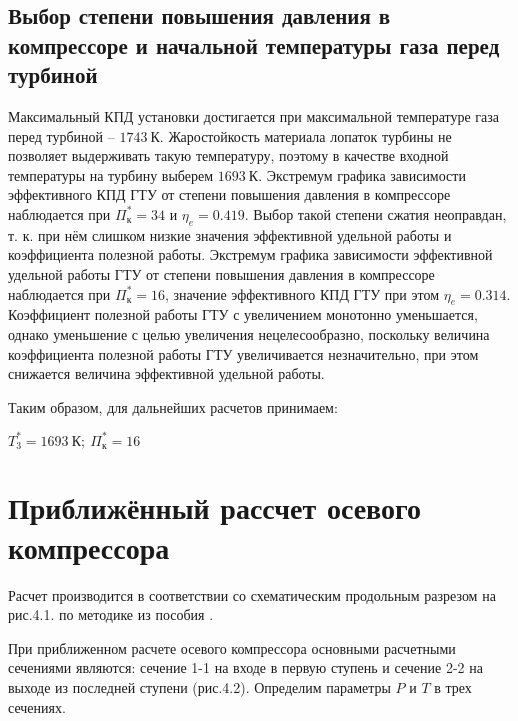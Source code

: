 

\newpage
\subsection{Выбор степени повышения давления в компрессоре и начальной температуры газа перед турбиной}

	Максимальный КПД установки достигается при максимальной температуре газа перед турбиной – $1743 \ \text{К}$. Жаростойкость материала лопаток турбины не позволяет выдерживать такую температуру, поэтому в качестве входной температуры на турбину выберем $1693 \ \text{К}$. Экстремум графика зависимости эффективного КПД ГТУ от степени повышения давления в компрессоре наблюдается при $\Pi_{\text{к}}^*=34$ и $\eta_e = 0.419$. Выбор такой степени сжатия неоправдан, т. к. при нём слишком низкие значения эффективной удельной работы и коэффициента полезной работы. Экстремум графика зависимости эффективной удельной работы ГТУ от степени повышения давления в компрессоре наблюдается при $\Pi_{\text{к}}^*=16$, значение эффективного КПД ГТУ при этом $\eta_e = 0.314$. Коэффициент полезной работы ГТУ с увеличением  монотонно уменьшается, однако уменьшение  с целью увеличения  нецелесообразно, поскольку величина коэффициента полезной работы ГТУ увеличивается незначительно, при этом снижается величина эффективной удельной работы.

 Таким образом, для дальнейших расчетов принимаем:
 
$T_3^* = 1693 \ \text{К}; \ \Pi_{\text{к}}^*=16$

\newpage
\section{Приближённый рассчет осевого компрессора}

Расчет производится в соответствии со схематическим продольным разрезом на рис.4.1. по методике из пособия \cite{COMP}.


При приближенном расчете осевого компрессора основными расчетными сечениями являются: сечение 1-1 на входе в первую ступень и сечение 2-2  на выходе из последней ступени (рис.4.2). Определим параметры $P$ и $T$ в трех сечениях.


